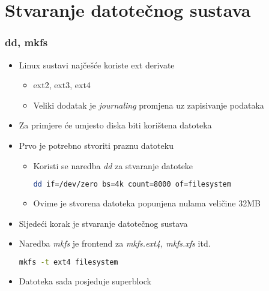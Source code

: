 \documentclass[croatian,t]{beamer} %
\begin{document}
	\section{Stvaranje datotečnog sustava}
	\begin{frame}[fragile]
	\frametitle{dd, mkfs}
		\begin{itemize}
			\item Linux sustavi najčešće koriste ext derivate 
			\begin{itemize}
				\item ext2, ext3, ext4
				\item Veliki dodatak je \textit{journaling} promjena uz zapisivanje podataka
			\end{itemize}
			\item Za primjere će umjesto diska biti korištena datoteka
			\item Prvo je potrebno stvoriti praznu datoteku
			\begin{itemize}
				\item Koristi se naredba \textit{dd} za stvaranje datoteke
				\begin{lstlisting}[basicstyle={\footnotesize\ttfamily},language=bash]
				dd if=/dev/zero bs=4k count=8000 of=filesystem
				\end{lstlisting}
				\item Ovime je stvorena datoteka popunjena nulama veličine 32MB
			\end{itemize}
			\item Sljedeći korak je stvaranje datotečnog sustava
			\item Naredba \textit{mkfs} je frontend za \textit{mkfs.ext4, mkfs.xfs} itd.
			\begin{lstlisting}[basicstyle={\footnotesize\ttfamily},language=bash]
			mkfs -t ext4 filesystem
			\end{lstlisting}
			\item Datoteka sada posjeduje superblock
		\end{itemize}
	\end{frame}
	
\end{document}
